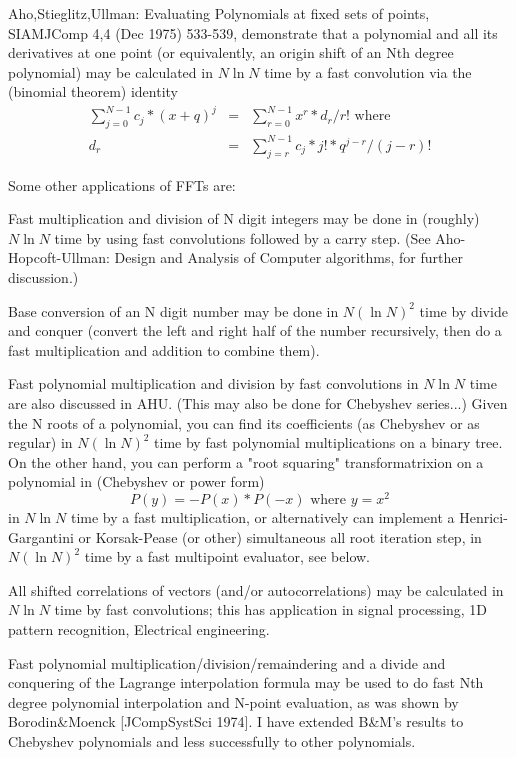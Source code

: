 Aho,Stieglitz,Ullman: Evaluating Polynomials at fixed sets of points,
SIAMJComp 4,4 (Dec 1975) 533-539, demonstrate that a polynomial and all its
derivatives at one point (or equivalently, an origin shift of an Nth
degree polynomial) may be calculated in $N\ln N$ time by a fast convolution
via the (binomial theorem) identity
\begin{eqnarray}
    \sum_{j=0}^{N-1} c_j*(x+q)^j  & = & \sum_{r=0}^{N-1} x^r * d_r/r!
  \mbox {  where}\\
    d_r & = & \sum_{j=r}^{N-1} c_j*j! * q^{j-r}/(j-r)!
\end{eqnarray}

Some other applications of FFTs are:

Fast multiplication and division of N digit integers may be done in
(roughly) $N\ln N$ time by using fast convolutions followed by a carry step.
(See Aho-Hopcoft-Ullman: Design and Analysis of Computer algorithms, for
further discussion.)

Base conversion of an N digit number may be done in $N(\ln N)^2$ time by
divide and conquer (convert the left and right half of the number recursively,
then do a fast multiplication and addition to combine them).

Fast polynomial multiplication and division by fast convolutions in $N\ln N$
time are also discussed in AHU. (This may also be done for Chebyshev
series...) Given the N roots of a polynomial, you can find its
coefficients (as Chebyshev or as regular) in $N(\ln N)^2$ time by fast
polynomial multiplications on a binary tree. On the other hand,
you can perform a "root squaring" transformatrixion on a polynomial
in (Chebyshev or power form)
\begin{equation}
   P(y) = -P(x)*P(-x)  \mbox{ where }y = x^2
\end{equation}
in $N\ln N$ time by a fast multiplication, or alternatively can implement
a Henrici-Gargantini or Korsak-Pease (or other) simultaneous all root iteration
step, in $N(\ln N)^2$ time by a fast multipoint evaluator, see below.

All shifted correlations of vectors (and/or autocorrelations) may be
calculated in $N\ln N$ time by fast convolutions; this has application in
signal processing, 1D pattern recognition, Electrical engineering.

Fast polynomial multiplication/division/remaindering and a divide and
conquering of the Lagrange interpolation formula may be used to do fast
Nth degree polynomial interpolation and N-point evaluation, as was
shown by Borodin\&Moenck [JCompSystSci 1974]. I have extended B\&M's
results to Chebyshev polynomials and less successfully to other
polynomials.

